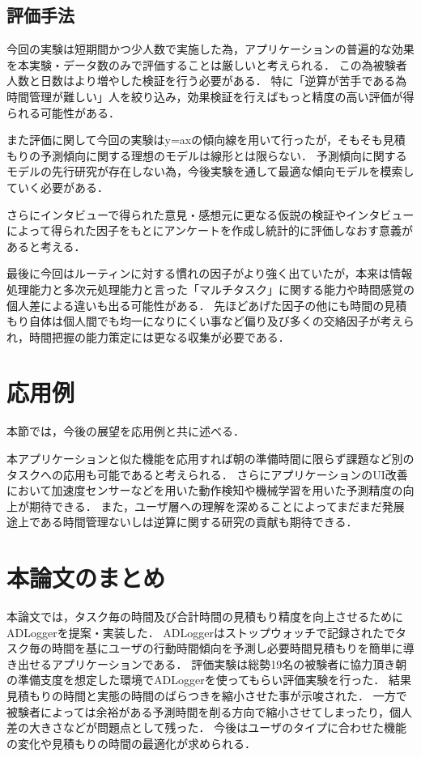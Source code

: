 \subsection{評価手法}
今回の実験は短期間かつ少人数で実施した為，アプリケーションの普遍的な効果を本実験・データ数のみで評価することは厳しいと考えられる．
この為被験者人数と日数はより増やした検証を行う必要がある．
特に「逆算が苦手である為時間管理が難しい」人を絞り込み，効果検証を行えばもっと精度の高い評価が得られる可能性がある．

また評価に関して今回の実験はy=axの傾向線を用いて行ったが，そもそも見積もりの予測傾向に関する理想のモデルは線形とは限らない．
予測傾向に関するモデルの先行研究が存在しない為，今後実験を通して最適な傾向モデルを模索していく必要がある．

さらにインタビューで得られた意見・感想元に更なる仮説の検証やインタビューによって得られた因子をもとにアンケートを作成し統計的に評価しなおす意義があると考える．

最後に今回はルーティンに対する慣れの因子がより強く出ていたが，本来は情報処理能力と多次元処理能力と言った「マルチタスク」に関する能力\cite{multitask}や時間感覚\cite{Tayama2018}の個人差による違いも出る可能性がある．
先ほどあげた因子の他にも時間の見積もり自体は個人間でも均一になりにくい事など偏り及び多くの交絡因子が考えられ，時間把握の能力策定には更なる収集が必要である．

\section{応用例}
本節では，今後の展望を応用例と共に述べる．

本アプリケーションと似た機能を応用すれば朝の準備時間に限らず課題など別のタスクへの応用も可能であると考えられる．
さらにアプリケーションのUI改善において加速度センサーなどを用いた動作検知や機械学習を用いた予測精度の向上が期待できる．
また，ユーザ層への理解を深めることによってまだまだ発展途上である時間管理ないしは逆算に関する研究の貢献も期待できる．
\section{本論文のまとめ}
本論文では，タスク毎の時間及び合計時間の見積もり精度を向上させるためにADLoggerを提案・実装した．
ADLoggerはストップウォッチで記録されたでタスク毎の時間を基にユーザの行動時間傾向を予測し必要時間見積もりを簡単に導き出せるアプリケーションである．
評価実験は総勢19名の被験者に協力頂き朝の準備支度を想定した環境でADLoggerを使ってもらい評価実験を行った．
結果見積もりの時間と実態の時間のばらつきを縮小させた事が示唆された．
一方で被験者によっては余裕がある予測時間を削る方向で縮小させてしまったり，個人差の大きさなどが問題点として残った．
今後はユーザのタイプに合わせた機能の変化や見積もりの時間の最適化が求められる．